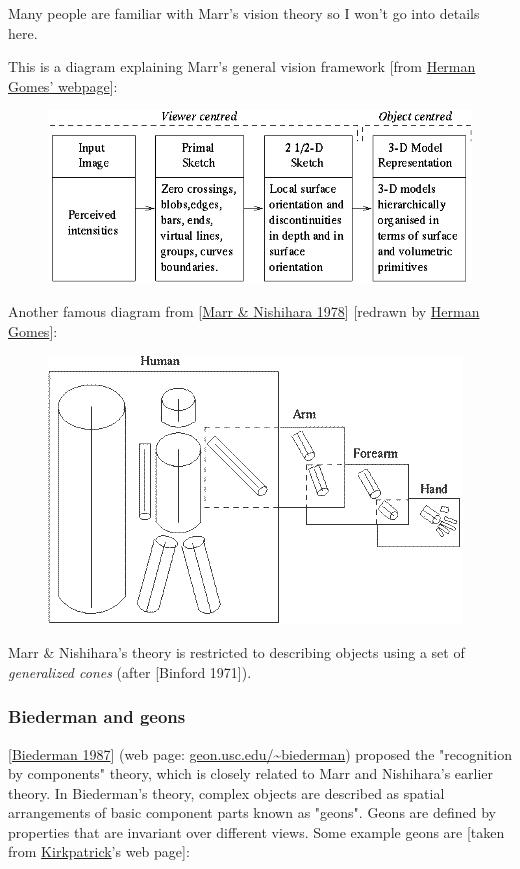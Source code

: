 Many people are familiar with Marr's vision theory so I won't go into details here.

This is a diagram explaining Marr's general vision framework [from \hyperlink{ref}{Herman Gomes' webpage}]:

\begin{figure}[H]
\centering
\includegraphics[scale=0.7]{MarrVisionFramework.PNG}
\end{figure}

Another famous diagram from [\hyperlink{ref}{Marr \& Nishihara 1978}] [redrawn by \hyperlink{ref}{Herman Gomes}]:

\begin{figure}[H]
\centering
\includegraphics[scale=0.7]{Marr3DModel.PNG}
\end{figure}

 Marr \& Nishihara's theory is restricted  to describing objects using a set of \emph{generalized cones} (after [Binford 1971]).

\subsubsection{Biederman and geons}

[\hyperlink{ref}{Biederman 1987}] (web page: \href{http://geon.usc.edu/~Ebiederman/}{geon.usc.edu/\textasciitilde biederman}) proposed the "recognition by components" theory, which is closely related to Marr and Nishihara's earlier theory. In Biederman's theory, complex objects are described as spatial arrangements of basic component parts known as "geons". Geons are defined by properties that are invariant over different views. Some example geons are [taken from \hyperlink{ref}{Kirkpatrick}'s web page]:

